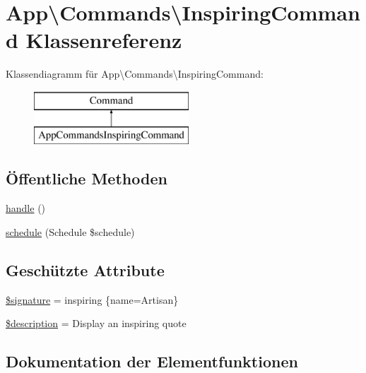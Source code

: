 \hypertarget{classApp_1_1Commands_1_1InspiringCommand}{}\section{App\textbackslash{}Commands\textbackslash{}Inspiring\+Command Klassenreferenz}
\label{classApp_1_1Commands_1_1InspiringCommand}
Klassendiagramm für App\textbackslash{}Commands\textbackslash{}Inspiring\+Command\+:\begin{figure}[H]
\begin{center}
\leavevmode
\includegraphics[height=2.000000cm]{db/dfd/classApp_1_1Commands_1_1InspiringCommand}
\end{center}
\end{figure}
\subsection*{Öffentliche Methoden}
\begin{DoxyCompactItemize}
\item 
\hyperlink{classApp_1_1Commands_1_1InspiringCommand_ac506e9f79c63e377b3e44cdc342905d9}{handle} ()
\item 
\hyperlink{classApp_1_1Commands_1_1InspiringCommand_a24c6cee63b989457fe53a0eadbea5e5a}{schedule} (Schedule \$schedule)
\end{DoxyCompactItemize}
\subsection*{Geschützte Attribute}
\begin{DoxyCompactItemize}
\item 
\hyperlink{classApp_1_1Commands_1_1InspiringCommand_a09425979370280753426d64988ccbffc}{\$signature} = \textquotesingle{}inspiring \{name=Artisan\}\textquotesingle{}
\item 
\hyperlink{classApp_1_1Commands_1_1InspiringCommand_ae99de1ffe330c8985d80052f41ea1562}{\$description} = \textquotesingle{}Display an inspiring quote\textquotesingle{}
\end{DoxyCompactItemize}


\subsection{Dokumentation der Elementfunktionen}
\mbox{\label{classApp_1_1Commands_1_1InspiringCommand_ac506e9f79c63e377b3e44cdc342905d9}} 
